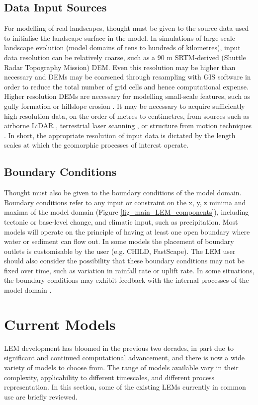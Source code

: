 \subsection{Data Input Sources}

For modelling of real landscapes, thought must be given to the source data used to initialise the landscape surface in the model. In simulations of large-scale landscape evolution (model domains of tens to hundreds of kilometres), input data resolution can be relatively coarse, such as a 90 m SRTM-derived (Shuttle Radar Topography Mission) DEM. Even this resolution may be higher than necessary and DEMs may be coarsened through resampling with GIS software in order to reduce the total number of grid cells and hence computational expense. Higher resolution DEMs are necessary for modelling small-scale features, such as gully formation or hillslope erosion \citep{Nearing2010}. It may be necessary to acquire sufficiently high resolution data, on the order of metres to centimetres, from sources such as airborne LiDAR \citep{gallay2013direct}, terrestrial laser scanning \citep{lemmens2011terrestrial}, or structure from motion techniques \citep{micheletti2015structure}. In short, the appropriate resolution of input data is dictated by the length scales at which the geomorphic processes of interest operate.

\subsection{Boundary Conditions}
Thought must also be given to the boundary conditions of the model domain. Boundary conditions refer to any input or constraint on the x, y, z minima and maxima of the model domain (Figure \ref{fig_main_LEM_components}), including tectonic or base-level change, and climatic input, such as precipitation. Most models will operate on the principle of having at least one open boundary where water or sediment can flow out. In some models the placement of boundary outlets is customisable by the user (e.g. CHILD, FastScape). The LEM user should also consider the possibility that these boundary conditions may not be fixed over time, such as variation in rainfall rate or uplift rate. In some situations, the boundary conditions may exhibit feedback with the internal processes of the model domain \citep{Raymo1992,Willett1999}.

\section{Current Models}
LEM development has bloomed in the previous two decades, in part due to significant and continued computational advancement, and there is now a wide variety of models to choose from. The range of models available vary in their complexity, applicability to different timescales, and different process representation. In this section, some of the existing LEMs currently in common use are briefly reviewed.


